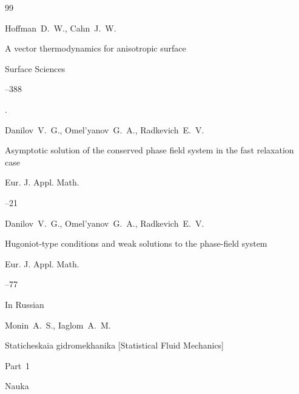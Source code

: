 \begin{thebibliography}{99}

\by Hoffman~D.~W., Cahn~J.~W.

\paper A vector thermodynamics for anisotropic surface

\jour Surface Sciences



--388


\moreref {}. \nofrills






\by Danilov~V.~G., Omel'yanov~G.~A., Radkevich~E.~V.

\paper Asymptotic solution of the conserved phase field system in the fast relaxation case

\jour Eur. J. Appl. Math.




--21





\by Danilov~V.~G., Omel'yanov~G.~A., Radkevich~E.~V.

\paper Hugoniot-type conditions and weak solutions to the phase-field system

\jour Eur. J. Appl. Math.




--77









\lang In Russian

\by Monin~A.~S., Iaglom~A.~M.

\book Staticheskaia gidromekhanika \rm [Statistical Fluid Mechanics]

\bookinfo Part~1


\publ Nauka


\end{thebibliography}
